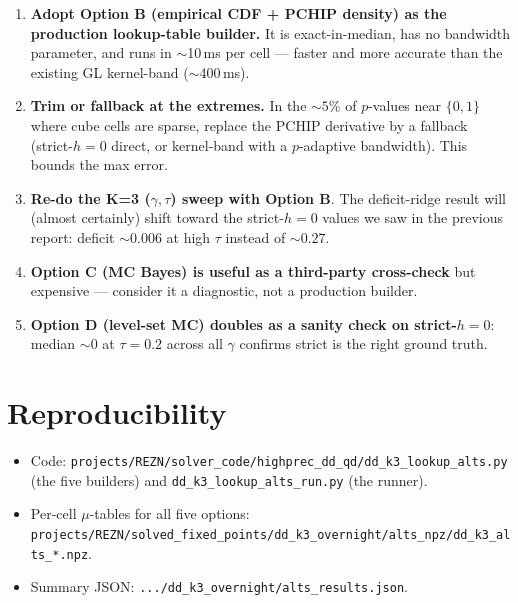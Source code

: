 \documentclass[11pt]{article}
\begin{document}
\begin{enumerate}
  \item \textbf{Adopt Option B (empirical CDF + PCHIP density) as the
        production lookup-table builder.} It is exact-in-median, has no
        bandwidth parameter, and runs in $\sim$10\,ms per cell --- faster
        and more accurate than the existing GL kernel-band ($\sim$400\,ms).
  \item \textbf{Trim or fallback at the extremes.} In the $\sim 5$\% of
        $p$-values near $\{0, 1\}$ where cube cells are sparse, replace the
        PCHIP derivative by a fallback (strict-$h{=}0$ direct, or kernel-band
        with a $p$-adaptive bandwidth). This bounds the max error.
  \item \textbf{Re-do the K=3 ($\gamma, \tau$) sweep with Option B}.
        The deficit-ridge result will (almost certainly) shift toward the
        strict-$h{=}0$ values we saw in the previous report: deficit
        $\sim 0.006$ at high $\tau$ instead of $\sim 0.27$.
  \item \textbf{Option C (MC Bayes) is useful as a third-party cross-check}
        but expensive --- consider it a diagnostic, not a production builder.
  \item \textbf{Option D (level-set MC) doubles as a sanity check on
        strict-$h{=}0$}: median $\sim 0$ at $\tau{=}0.2$ across all
        $\gamma$ confirms strict is the right ground truth.
\end{enumerate}

\section{Reproducibility}

\begin{itemize}
  \item Code: \texttt{projects/REZN/solver\_code/highprec\_dd\_qd/dd\_k3\_lookup\_alts.py}
        (the five builders) and \texttt{dd\_k3\_lookup\_alts\_run.py} (the runner).
  \item Per-cell $\mu$-tables for all five options:
        \texttt{projects/REZN/solved\_fixed\_points/dd\_k3\_overnight/alts\_npz/dd\_k3\_alts\_*.npz}.
  \item Summary JSON: \texttt{.../dd\_k3\_overnight/alts\_results.json}.
\end{itemize}
\end{document}
